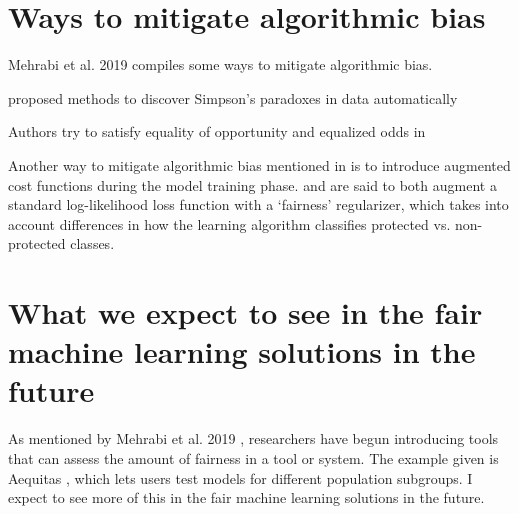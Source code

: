 \documentclass[conference]{IEEEtran}
\begin{document}
\section{Ways to mitigate algorithmic bias}
Mehrabi et al. 2019 \cite{DBLP:journals/corr/abs-1908-09635} compiles some ways to mitigate algorithmic bias.

\cite{DBLP:journals/corr/abs-1801-04385, DBLP:journals/corr/abs-1805-03094} proposed methods to discover
Simpson’s paradoxes in data automatically

Authors try to satisfy equality of opportunity and equalized odds in \cite{DBLP:journals/corr/HardtPS16}

Another way to mitigate algorithmic bias mentioned in \cite{d_Alessandro_2017} is to introduce augmented cost functions during the model training phase. \cite{article} and \cite{DBLP:journals/corr/Zliobaite15} are said to both augment a standard log-likelihood loss function with a ‘fairness’ regularizer, which takes into account differences in how the learning algorithm classifies protected vs. non-protected classes.

\section{What we expect to see in the fair machine learning solutions in the future}
As mentioned by Mehrabi et al. 2019 \cite{DBLP:journals/corr/abs-1908-09635}, researchers have begun introducing tools that can assess the amount of fairness in a tool or system. The example given is Aequitas \cite{DBLP:journals/corr/abs-1811-05577}, which lets users test models for different population subgroups. I expect to see more of this in the fair machine learning solutions in the future.



\end{document}
